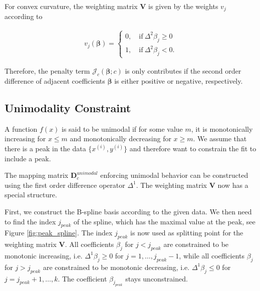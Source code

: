 \documentclass[10pt,a4paper]{article}
\begin{document}
	For convex curvature, the weighting matrix $\boldsymbol{V}$ is given by the weights $v_j$ according to

	\begin{align}\label{eq:v_curvature_convex}
		v_j(\boldsymbol{\beta}) = \begin{cases} 
										0, \quad \text{if} \ \Delta^2\beta_j \ge 0 \\ 
										1, \quad \text{if} \ \Delta^2\beta_j < 0. 
								  \end{cases}
	\end{align}	
	
	Therefore, the penalty term $\mathcal{J}_c(\boldsymbol{\beta}; c)$ is only contributes if the second order difference of adjacent coefficients $\boldsymbol{\beta}$ is either positive or negative, respectively. \cite{eilers2005unimodal}
	
	\subsection{Unimodality Constraint}
	
	A function $f(x)$ is said to be unimodal if for some value $m$, it is monotonically increasing for $x \le m$ and monotonically decreasing for $x \ge m$. We assume that there is a peak in the data $\{x^{(i)}, y^{(i)}\}$ and therefore want to constrain the fit to include a peak.
	
	The mapping matrix $\boldsymbol{D}_c^{unimodal}$ enforcing unimodal behavior can be constructed using the first order difference operator $\Delta^1$. The weighting matrix $\boldsymbol{V}$ now has a special structure. 
	
	First, we construct the B-spline basis according to the given data. We then need to find the index $j_{peak}$ of the spline, which has the maximal value at the peak, see Figure \ref{fig:peak_spline}. The index $j_{peak}$ is now used as splitting point for the weighting matrix $\boldsymbol{V}$. All coefficients $\beta_j$ for $j < j_{peak}$ are constrained to be monotonic increasing, i.e. $\Delta^1 \beta_j \ge 0$ for $j = 1, \dots, j_{peak}-1$, while all coefficients $\beta_j$ for $j > j_{peak}$ are constrained to be monotonic decreasing, i.e. $\Delta^1 \beta_j \le 0$ for $j = j_{peak}+1, \dots, k$. The coefficient $\beta_{j_{peak}}$ stays unconstrained. \cite{eilers2005unimodal} 
	
\end{document}
